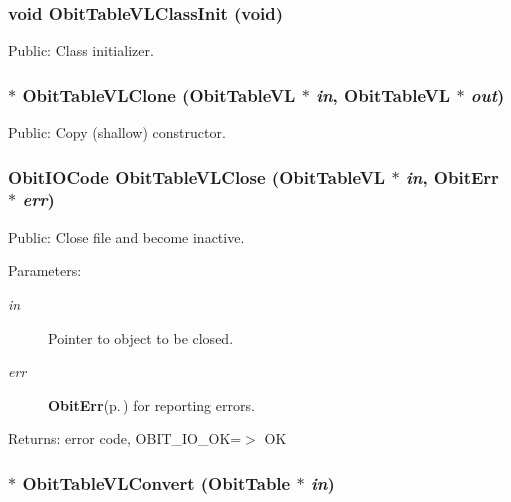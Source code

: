 \subsubsection{\setlength{\rightskip}{0pt plus 5cm}void Obit\-Table\-VLClass\-Init (void)}\label{ObitTableVL_8h_a10}


Public: Class initializer. 

\subsubsection{$\ast$ Obit\-Table\-VLClone ({\bf Obit\-Table\-VL} $\ast$ {\em in}, {\bf Obit\-Table\-VL} $\ast$ {\em out})}\label{ObitTableVL_8h_a15}


Public: Copy (shallow) constructor. 

\subsubsection{\setlength{\rightskip}{0pt plus 5cm}Obit\-IOCode Obit\-Table\-VLClose ({\bf Obit\-Table\-VL} $\ast$ {\em in}, {\bf Obit\-Err} $\ast$ {\em err})}\label{ObitTableVL_8h_a21}


Public: Close file and become inactive. 

\begin{Desc}
\item[Parameters:]
\begin{description}
\item[{\em in}]Pointer to object to be closed. \item[{\em err}]{\bf Obit\-Err}{\rm (p.\,\pageref{structObitErr})} for reporting errors. \end{description}
\end{Desc}
\begin{Desc}
\item[Returns:]error code, OBIT\_\-IO\_\-OK=$>$ OK \end{Desc}
\subsubsection{$\ast$ Obit\-Table\-VLConvert ({\bf Obit\-Table} $\ast$ {\em in})}\label{ObitTableVL_8h_a16}


